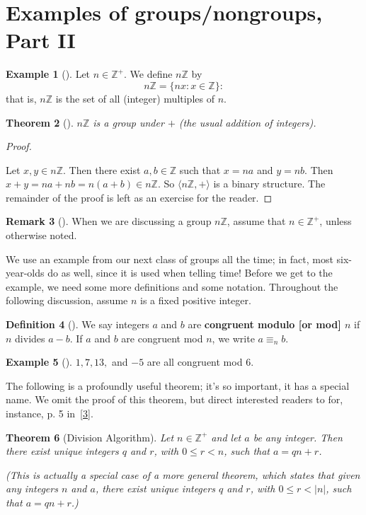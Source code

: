 \documentclass[10pt,openany,oneside]{book}
\newcommand{\terminology}[1]{\textbf{#1}}
\theoremstyle{plain}
\newtheorem{theorem}{Theorem}[section]
\theoremstyle{definition}
\newtheorem{definition}[theorem]{Definition}
\theoremstyle{definition}
\newtheorem{remark}[theorem]{Remark}
\theoremstyle{definition}
\newtheorem{example}[theorem]{Example}
\theoremstyle{definition}
\numberwithin{equation}{section}
\def\Z{\mathbb{Z}}
\newcommand{\lt}{<}
\begin{document}
\section[{Examples of groups/nongroups, Part II}]{Examples of groups/nongroups, Part II}\label{section-8}
\begin{example}[]\label{example-14}
\label{notation-38}
 Let \(n\in \Z^+\). We define \(n\Z\) by%
\begin{equation*}
n\Z=\{nx: x\in \Z\}:
\end{equation*}
that is, \(n\Z\) is the set of all (integer) multiples of \(n\).%
\end{example}
\begin{theorem}[{}]\label{nz}
\(n\Z\) is a group under \(+\) (the usual addition of integers).%
\end{theorem}
\begin{proof}\hypertarget{proof-12}{}
Let \(x, y\in n\Z\). Then there exist \(a,b\in \Z\) such that \(x=na\) and \(y=nb\). Then \(x+y=na+nb=n(a+b)\in n\Z\). So \(\langle n\Z,+\rangle\) is a binary structure. The remainder of the proof is left as an exercise for the reader.%
\end{proof}
\begin{remark}[]\label{remark-12}
When we are discussing a group \(n\Z\), assume that \(n\in \Z^+\), unless otherwise noted.%
\end{remark}
We use an example from our next class of groups all the time; in fact, most six-year-olds do as well, since it is used when telling time! Before we get to the example, we need some more definitions and some notation. Throughout the following discussion, assume \(n\) is a fixed positive integer.%
\begin{definition}[{}]\label{definition-23}
\label{notation-39}
We say integers \(a\) and \(b\) are \terminology{congruent modulo [or mod] \(n\)} if \(n\) divides \(a-b\). If \(a\) and \(b\) are congruent mod \(n\), we write \(a \equiv_n b\).%
\end{definition}
\begin{example}[]\label{cong_ex}
\(1, 7, 13,\) and \(-5\) are all congruent mod \(6\).%
\end{example}
The following is a profoundly useful theorem; it's so important, it has a special name. We omit the proof of this theorem, but direct interested readers to for, instance, p. 5 in~\hyperlink{NZM}{[3]}.%
\begin{theorem}[{Division Algorithm}]\label{divalg}
Let \(n\in \Z^+\) and let \(a\) be any integer. Then there exist unique integers \(q\) and \(r\), with \(0\leq
r \lt n\), such that \(a=qn+r\).%
\par
(This is actually a special case of a more general theorem, which states that given any integers \(n\) and \(a\), there exist unique integers \(q\) and \(r\), with \(0\leq
r\lt |n|\), such that \(a=qn+r\).)%
\end{theorem}
\end{document}
